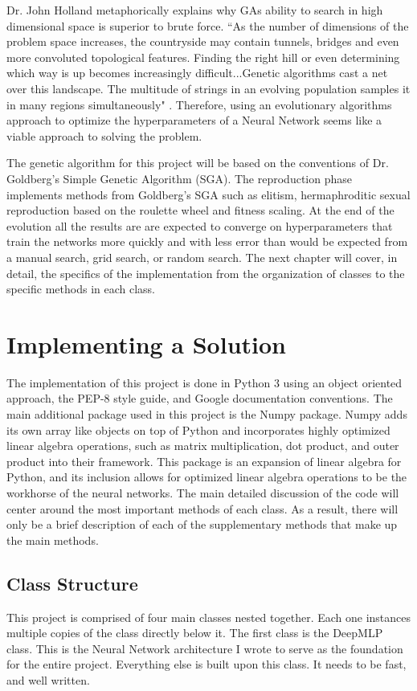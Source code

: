 \documentclass[12pt]{report}
\begin{document}
Dr. John Holland metaphorically explains why GAs ability to search in high dimensional space is superior to brute force. ``As the number of dimensions of the problem space increases, the countryside may contain tunnels, bridges and even more convoluted topological features. Finding the right hill or even determining which way is up becomes increasingly difficult...Genetic algorithms cast a net over this landscape. The multitude of strings in an evolving population samples it in many regions simultaneously" \cite{10.2307/24939139}. Therefore, using an evolutionary algorithms approach to optimize the hyperparameters of a Neural Network seems like a viable approach to solving the problem.

The genetic algorithm for this project will be based on the conventions of Dr. Goldberg's Simple Genetic Algorithm (SGA). The reproduction phase implements methods from Goldberg's SGA such as elitism, hermaphroditic sexual reproduction based on the roulette wheel and fitness scaling. At the end of the evolution all the results are are expected to converge on hyperparameters that train the networks more quickly and with less error than would be expected from a manual search, grid search, or random search. The next chapter will cover, in detail, the specifics of the implementation from the organization of classes to the specific methods in each class.

\chapter{Implementing a Solution}
The implementation of this project is done in Python 3 using an object oriented approach, the PEP-8 style guide, and Google documentation conventions. The main additional package used in this project is the Numpy package. Numpy adds its own array like objects on top of Python and incorporates highly optimized linear algebra operations, such as matrix multiplication, dot product, and outer product into their framework. This package is an expansion of linear algebra for Python, and its inclusion allows for optimized linear algebra operations to be the workhorse of the neural networks. The main detailed discussion of the code will center around the most important methods of each class. As a result, there will only be a brief description of each of the supplementary methods that make up the main methods.

\section{Class Structure}
This project is comprised of four main classes nested together. Each one instances multiple copies of the class directly below it.
The first class is the DeepMLP class. This is the Neural Network architecture I wrote to serve as the foundation for the entire project.
Everything else is built upon this class. It needs to be fast, and well written.
\end{document}
